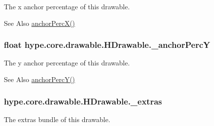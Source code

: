 The x anchor percentage of this drawable. 

\begin{DoxySeeAlso}{See Also}
\hyperlink{classhype_1_1core_1_1drawable_1_1_h_drawable_a61972696a8beb2118f118de9cbab90aa}{anchor\-Perc\-X()} 
\end{DoxySeeAlso}
\hypertarget{classhype_1_1core_1_1drawable_1_1_h_drawable_a14172ed41bc22c209a9a7aae34a8d835}{
\subsubsection[{\-\_\-anchor\-Perc\-Y}]{\setlength{\rightskip}{0pt plus 5cm}float hype.\-core.\-drawable.\-H\-Drawable.\-\_\-anchor\-Perc\-Y\hspace{0.3cm}{\ttfamily [protected]}}}\label{classhype_1_1core_1_1drawable_1_1_h_drawable_a14172ed41bc22c209a9a7aae34a8d835}


The y anchor percentage of this drawable. 

\begin{DoxySeeAlso}{See Also}
\hyperlink{classhype_1_1core_1_1drawable_1_1_h_drawable_aa533e99dd9d51a2c7c0dfbe9aa333fda}{anchor\-Perc\-Y()} 
\end{DoxySeeAlso}
\hypertarget{classhype_1_1core_1_1drawable_1_1_h_drawable_a1a8ae31b67c5adc319cd8108b16171fe}{
\subsubsection[{\-\_\-extras}]{ hype.\-core.\-drawable.\-H\-Drawable.\-\_\-extras\hspace{0.3cm}{\ttfamily [protected]}}}\label{classhype_1_1core_1_1drawable_1_1_h_drawable_a1a8ae31b67c5adc319cd8108b16171fe}


The extras bundle of this drawable. 

